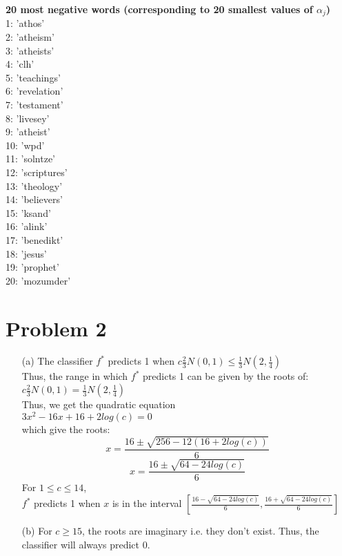 \documentclass[fleqn]{article}
\begin{document}
\begin{itemize}
                \textbf{20 most negative words (corresponding to 20 smallest values of $\alpha_j$)}\\
                1: 'athos'\\
                2: 'atheism'\\
                3: 'atheists'\\
                4: 'clh'\\
                5: 'teachings'\\
                6: 'revelation'\\
                7: 'testament'\\
                8: 'livesey'\\
                9: 'atheist'\\
                10: 'wpd'\\
                11: 'solntze'\\
                12: 'scriptures'\\
                13: 'theology'\\
                14: 'believers'\\
                15: 'ksand'\\
                16: 'alink'\\
                17: 'benedikt'\\
                18: 'jesus'\\
                19: 'prophet'\\
                20: 'mozumder'\\
\end{itemize}
\section{Problem 2}{}
\begin{itemize}
	\item[(a)] The classifier $f^*$ predicts 1 when $c \frac{2}{3}N(0,1) \leq \frac{1}{3}N(2, \frac{1}{4})$\\
		Thus, the range in which $f^*$ predicts 1 can be given by the roots of:\\
		$c \frac{2}{3}N(0,1) = \frac{1}{3}N(2, \frac{1}{4})$\\
		Thus, we get the quadratic equation\\
		$3x^2 - 16x + 16 + 2log(c) = 0$\\
		which give the roots:\\
		\[ x = \frac{16 \pm \sqrt{256 - 12(16 + 2log(c))}}{6} \]
		\[ x = \frac{16 \pm \sqrt{64 - 24log(c)}}{6} \]
		For $1 \leq c \leq 14$,\\
		$f^*$ predicts 1 when $x$ is in the interval $[\frac{16 - \sqrt{64 - 24log(c)}}{6}, \frac{16 + \sqrt{64 - 24log(c)}}{6}]$\\

        \item[(b)] 
		For $c \geq 15$, the roots are imaginary i.e. they don't exist. Thus, the classifier will always predict 0.\\
\end{itemize}
\end{document}
